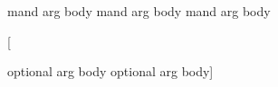 \mycommand

{

	mand arg body
	mand arg body
	mand arg body}

%

[

	optional arg body
	optional arg body]
